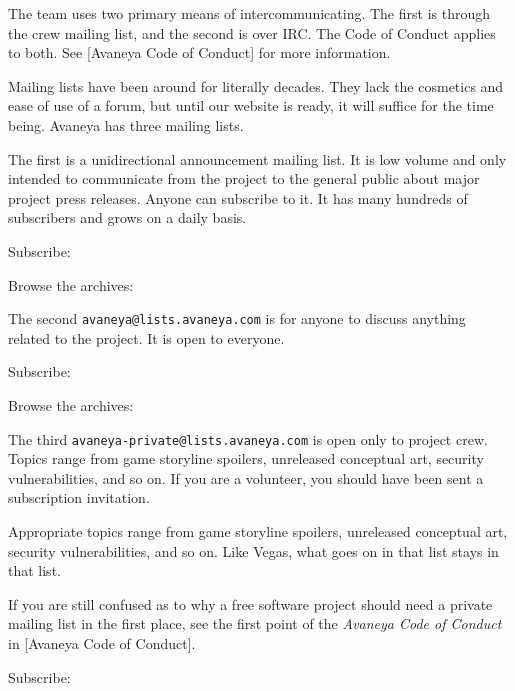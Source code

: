 
The team uses two primary means of intercommunicating. The first is through the crew mailing list, and the second is over IRC. The Code of Conduct applies to both. See [Avaneya Code of Conduct] for more information.

Mailing lists have been around for literally decades. They lack the cosmetics and ease of use of a forum, but until our website is ready, it will suffice for the time being. Avaneya has three mailing lists. 

The first is a unidirectional announcement mailing list. It is low volume and only intended to communicate from the project to the general public about major project press releases. Anyone can subscribe to it. It has many hundreds of subscribers and grows on a daily basis.

Subscribe:\crlf
{} 

Browse the archives:\crlf
{}

The second {\tt avaneya@lists.avaneya.com} is for anyone to discuss anything related to the project. It is open to everyone.

Subscribe:\crlf
{} 

Browse the archives:\crlf
{}

The third {\tt avaneya-private@lists.avaneya.com} is open only to project crew. Topics range from game storyline spoilers, unreleased conceptual art, security vulnerabilities, and so on. If you are a volunteer, you should have been sent a subscription invitation. 

Appropriate topics range from game storyline spoilers, unreleased conceptual art, security vulnerabilities, and so on. Like Vegas, what goes on in that list stays in that list.

If you are still confused as to why a free software project should need a private mailing list in the first place, see the first point of the {\it Avaneya Code of Conduct} in [Avaneya Code of Conduct].

Subscribe:\crlf
{} 

